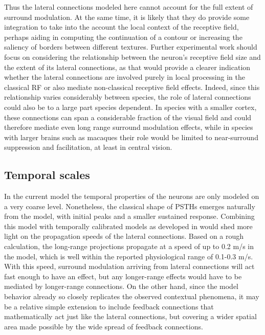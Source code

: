 Thus the lateral connections modeled here cannot account for the
full extent of surround modulation. At the same time, it is likely that
they do provide some integration to take into the account the local
context of the receptive field, perhaps aiding in computing the
continuation of a contour or increasing the saliency of borders
between different textures. Further experimental work should focus on
considering the relationship between the neuron's receptive field size
and the extent of its lateral connections, as that would provide a
clearer indication whether the lateral connections are involved purely
in local processing in the classical RF or also mediate non-classical
receptive field effects. Indeed, since this relationship varies
considerably between species, the role of lateral connections could
also be to a large part species dependent. In species with a smaller
cortex, these connections can span a considerable fraction of the
visual field and could therefore mediate even long range surround
modulation effects, while in species with larger brains such as
macaques their role would be limited to near-surround suppression and
facilitation, at least in central vision.

\subsection{Temporal scales}

In the current model the temporal properties of the neurons are only
modeled on a very coarse level. Nonetheless, the classical shape of
PSTHs emerges naturally from the model, with initial peaks and a
smaller sustained response. Combining this model with
temporally calibrated models as developed in \cite{Stevens2016} would
shed more light on the propagation speeds of the lateral connections. 
Based on a rough calculation, the long-range projections
propagate at a speed of up to 0.2 m/s in the model, which is well
within the reported physiological range of 0.1-0.3 m/s.
With this speed, surround modulation arriving from lateral connections
will act fast enough to have an effect, but any longer-range effects
would have to be mediated by longer-range connections.  On the other
hand, since the model behavior already so closely replicates the
observed contextual phenomena, it may be a relative simple extension
to include feedback connections that mathematically act just like the
lateral connections, but covering a wider spatial area made possible
by the wide spread of feedback connections.

